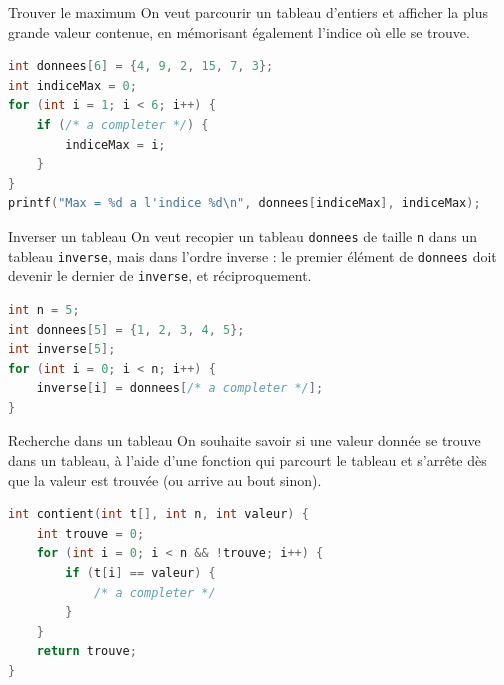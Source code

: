 \begin{UPSTIexercice}{Trouver le maximum}
    On veut parcourir un tableau d'entiers et afficher la plus grande valeur contenue, en mémorisant également l'indice où elle se trouve.

    \begin{lstlisting}[language=C]
int donnees[6] = {4, 9, 2, 15, 7, 3};
int indiceMax = 0;
for (int i = 1; i < 6; i++) {
    if (/* a completer */) {
        indiceMax = i;
    }
}
printf("Max = %d a l'indice %d\n", donnees[indiceMax], indiceMax);
    \end{lstlisting}

\end{UPSTIexercice}


\begin{UPSTIexercice}{Inverser un tableau}
    On veut recopier un tableau \texttt{donnees} de taille \texttt{n} dans un tableau \texttt{inverse}, mais dans l'ordre inverse : le premier élément de \texttt{donnees} doit devenir le dernier de \texttt{inverse}, et réciproquement.

    \begin{lstlisting}[language=C]
int n = 5;
int donnees[5] = {1, 2, 3, 4, 5};
int inverse[5];
for (int i = 0; i < n; i++) {
    inverse[i] = donnees[/* a completer */];
}
    \end{lstlisting}

\end{UPSTIexercice}


\begin{UPSTIexercice}{Recherche dans un tableau}
    On souhaite savoir si une valeur donnée se trouve dans un tableau, à l'aide d'une fonction qui parcourt le tableau et s'arrête dès que la valeur est trouvée (ou arrive au bout sinon).

    \begin{lstlisting}[language=C]
int contient(int t[], int n, int valeur) {
    int trouve = 0;
    for (int i = 0; i < n && !trouve; i++) {
        if (t[i] == valeur) {
            /* a completer */
        }
    }
    return trouve;
}
    \end{lstlisting}

\end{UPSTIexercice}

